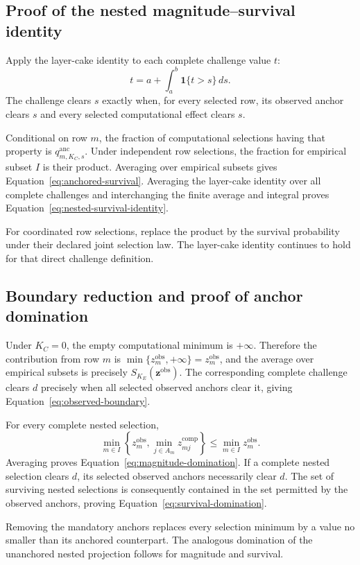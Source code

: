 \documentclass[11pt]{article}
\theoremstyle{remark}
\begin{document}
\subsection{Proof of the nested magnitude--survival identity}
\label{app:proof-survival-identity}

Apply the layer-cake identity to each complete challenge value $t$:
\[
t
=
a+\int_a^b\mathbf 1\{t>s\}\,ds.
\]
The challenge clears $s$ exactly when, for every selected row, its observed
anchor clears $s$ and every selected computational effect clears $s$.

Conditional on row $m$, the fraction of computational selections having that
property is $q^{\mathrm{anc}}_{m,K_C,s}$. Under independent row selections, the
fraction for empirical subset $I$ is their product. Averaging over empirical
subsets gives Equation~\eqref{eq:anchored-survival}. Averaging the layer-cake
identity over all complete challenges and interchanging the finite average and
integral proves Equation~\eqref{eq:nested-survival-identity}.

For coordinated row selections, replace the product by the survival
probability under their declared joint selection law. The layer-cake identity
continues to hold for that direct challenge definition.

\subsection{Boundary reduction and proof of anchor domination}
\label{app:proof-anchor-domination}

Under $K_C=0$, the empty computational minimum is $+\infty$. Therefore
the contribution from row $m$ is
$\min\{z_m^{\mathrm{obs}},+\infty\}=z_m^{\mathrm{obs}}$, and the average over
empirical subsets is precisely $S_{K_E}(\mathbf z^{\mathrm{obs}})$. The
corresponding complete challenge clears $d$ precisely when all selected
observed anchors clear it, giving Equation~\eqref{eq:observed-boundary}.

For every complete nested selection,
\[
\min_{m\in I}
\left\{z_m^{\mathrm{obs}},
\min_{j\in A_m}z_{mj}^{\mathrm{comp}}\right\}
\leq
\min_{m\in I}z_m^{\mathrm{obs}}.
\]
Averaging proves Equation~\eqref{eq:magnitude-domination}. If a complete
nested selection clears $d$, its selected observed anchors necessarily clear
$d$. The set of surviving nested selections is consequently contained in the
set permitted by the observed anchors, proving
Equation~\eqref{eq:survival-domination}.

Removing the mandatory anchors replaces every selection minimum by a value no
smaller than its anchored counterpart. The analogous domination of the
unanchored nested projection follows for magnitude and survival.
\end{document}
